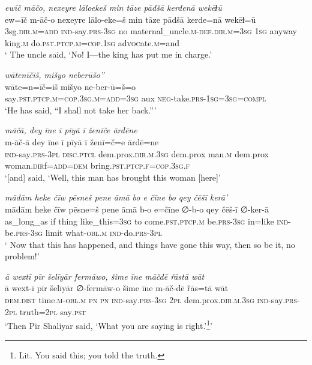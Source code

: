 \ea \label{ZP.107}
\textit{ewīč māčo, nexeyre lāloekeš min tāze pādšā kerdenā wekēɫū} \\ 
\gll ew=īč m-āč-o nexeyre lālo-eke=š min tāze pādšā kerde=nā wekēɫ=ū \\ 
 3sg\textsc{.dir}\textsc{.m}\textsc{=add} \textsc{ind-}say\textsc{.prs}\textsc{-3sg} no maternal\_uncle\textsc{.m}\textsc{-def}\textsc{.dir}\textsc{.m}\textsc{=3sg} \textsc{1sg} anyway king\textsc{.m} do\textsc{.pst}\textsc{.ptcp}\textsc{.m}\textsc{=cop}\textsc{.\textsc{1sg}} ad\textsc{voc}ate\textsc{.m}=and \\ 
\glt ` The uncle said, ‘No! I—the king has put me in charge.'
\z 
 
\ea \label{ZP.108}
\textit{wātenīčiš, mišyo neberūšo”} \\ 
\gll wāte=n=īč=iš mišyo ne-ber-ū=š=o \\ 
 say\textsc{.pst}\textsc{.ptcp}\textsc{.m}\textsc{=cop}\textsc{.3sg}\textsc{.m}\textsc{=add}\textsc{=3sg} aux \textsc{neg-}take\textsc{.prs}\textsc{-\textsc{1sg}}\textsc{=3sg}\textsc{=compl} \\ 
\glt `He has said, “I shall not take her back.”'
\z 
 
\ea \label{ZP.115}
\textit{māčā, dey īne ī pīyā ī ženīče ārdēne} \\ 
\gll m-āč-ā dey īne ī pīyā ī ženī=č=e ārdē=ne \\ 
 \textsc{ind-}say\textsc{.prs}\textsc{-3pl} \textsc{disc.ptcl} dem.prox\textsc{.dir}\textsc{.m}\textsc{.3sg} dem.prox man\textsc{.m} dem.prox woman\textsc{.dir}f\textsc{=add}\textsc{=dem} bring\textsc{.pst}\textsc{.ptcp}\textsc{.f}\textsc{=cop}\textsc{.3sg}\textsc{.f} \\ 
\glt `[and] said, ‘Well, this man has brought this woman [here]'
\z 
 
\ea \label{ZP.125}
\textit{māđām heke čīw pēsneš pene āmā bo e čīne bo qey čēšī kerā’} \\ 
\gll māđām heke čīw pēsne=š pene āmā b-o e=čīne ∅-b-o qey čēš-ī ∅-ker-ā \\ 
 as\_long\_as if thing like\_this\textsc{=3sg} to come\textsc{.pst}\textsc{.ptcp}\textsc{.m} be\textsc{.prs}\textsc{-3sg} in=like \textsc{ind-}be\textsc{.prs}\textsc{-3sg} limit what\textsc{-obl}\textsc{.m} \textsc{ind-}do\textsc{.prs}\textsc{-3pl} \\ 
\glt ` Now that this has happened, and things have gone this way, then so be it, no problem!'
\z 
 
\ea \label{ZP.126}
\textit{ā wextī pīr šelīyār fermāwo, šime īne māčdē řāstā wāt} \\ 
\gll ā wext-ī pīr šelīyār ∅-fermāw-o šime īne m-āč-dē řās=tā wāt \\ 
 \textsc{dem.dist} time\textsc{.m}\textsc{-obl}\textsc{.m} \textsc{pn} \textsc{pn} \textsc{ind-}say\textsc{.prs}\textsc{-3sg} \textsc{2pl} dem.prox\textsc{.dir}\textsc{.m}\textsc{.3sg} \textsc{ind-}say\textsc{.prs}-\textsc{2pl} truth=\textsc{2pl} say\textsc{.pst} \\ 
\glt `Then Pir Shaliyar said, ‘What you are saying is right.’\footnote{Lit. You said this; you told the truth.}'
\z 
 
